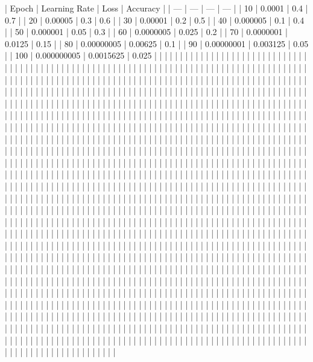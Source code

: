 | Epoch | Learning Rate | Loss | Accuracy |
| --- | --- | --- | --- |
| 10 | 0.0001 | 0.4 | 0.7 |
| 20 | 0.00005 | 0.3 | 0.6 |
| 30 | 0.00001 | 0.2 | 0.5 |
| 40 | 0.000005 | 0.1 | 0.4 |
| 50 | 0.000001 | 0.05 | 0.3 |
| 60 | 0.0000005 | 0.025 | 0.2 |
| 70 | 0.0000001 | 0.0125 | 0.15 |
| 80 | 0.00000005 | 0.00625 | 0.1 |
| 90 | 0.00000001 | 0.003125 | 0.05 |
| 100 | 0.000000005 | 0.0015625 | 0.025 | | | | | | | | | | | | | | | | | | | | | | | | | | | | | | | | | | | | | | | | | | | | | | | | | | | | | | | | | | | | | | | | | | | | | | | | | | | | | | | | | | | | | | | | | | | | | | | | | | | | | | | | | | | | | | | | | | | | | | | | | | | | | | | | | | | | | | | | | | | | | | | | | | | | | | | | | | | | | | | | | | | | | | | | | | | | | | | | | | | | | | | | | | | | | | | | | | | | | | | | | | | | | | | | | | | | | | | | | | | | | | | | | | | | | | | | | | | | | | | | | | | | | | | | | | | | | | | | | | | | | | | | | | | | | | | | | | | | | | | | | | | | | | | | | | | | | | | | | | | | | | | | | | | | | | | | | | | | | | | | | | | | | | | | | | | | | | | | | | | | | | | | | | | | | | | | | | | | | | | | | | | | | | | | | | | | | | | | | | | | | | | | | | | | | | | | | | | | | | | | | | | | | | | | | | | | | | | | | | | | | | | | | | | | | | | | | | | | | | | | | | | | | | | | | | | | | | | | | | | | | | | | | | | | | | | | | | | | | | | | | | | | | | | | | | | | | | | | | | | | | | | | | | | | | | | | | | | | | | | | | | | | | | | | | | | | | | | | | | | | | | | | | | | | | | | | | | | | | | | | | | | | | | | | | | | | | | | | | | | | | | | | | | | | | | | | | | | | | | | | | | | | | | | | | | | | | | | | | | | | | | | | | | | | | | | | | | | | | | | | | | | | | | | | | | | | | | | | | | | | | | | | | | | | | | | | | | | | | | | | | | | | | | | | | | | | | | | | | | | | | | | | | | | | | | | | | | | | | | | | | | | | | | | | | | | | | | | | | | | | | | | | | | | | | | | | | | | | | | | | | | | | | | | | | | | | | | | | | | | | | | | | | | | | | | | | | | | | | | | | | | | | | | | | | | | | | | | | | | | | | | | | | | | | | | | | | | | | | | | | | | | | | | | | | | | | | | | | | | | | | | | | | | | | | | | | | | | | | | | | | | | | | | | | | | | | | | | | | | | | | | | | | | | | | | | | | | | | | | | | | | | | | | | | | | | | | | | | | | | | | | | | | | | | | | | | | | | | | | | | | | | | | | | | | | | | | | | | | | | | | | | | | | | | | | | | | | | | | | | | | | | | | | | | | | | | | | | | | | | | | | | | | | | | | | | | | | | | | | | | | | | | | | | | | | | | | | | | | | | | | | | | | | | | | | | | | | | | | | | | | | | | | | | | | | | | | | | | | | | | | | | | | | | | | | | | | | | | | | | | | | | | | | | | | | | | | | | | | | | | | | | | | | | | | | | | | | | | | | | | | | | | | | | | | | | | | | | | | | | | | | | | | | | | | | | | | | | | | | | | | | | | | | | | | | | | | | | | | | | | | | | | | | | | | | | | | | | | | | | | | | | | | | | | | | | | | | | | | | | | | | | | | | | | | | | | | | | | | | | | | | | | | | | | | | | | | | | | | | | | | | | | | | | | | | | | | | | | | | | | | | | | | | | | | | | | | | | | | | | | | | | | | | | | | | | | | | | | | | | | | | | | | | | | | | | | | | | | | | | | | | | | | | | | | | | | | | | | | | | | | | | | | | | | | | | | | | | | | | | | | | | | | | | | | | | | | | | | | | | | | | | | | | | | | | | | | | | | | | | | | | | | | | | | 
